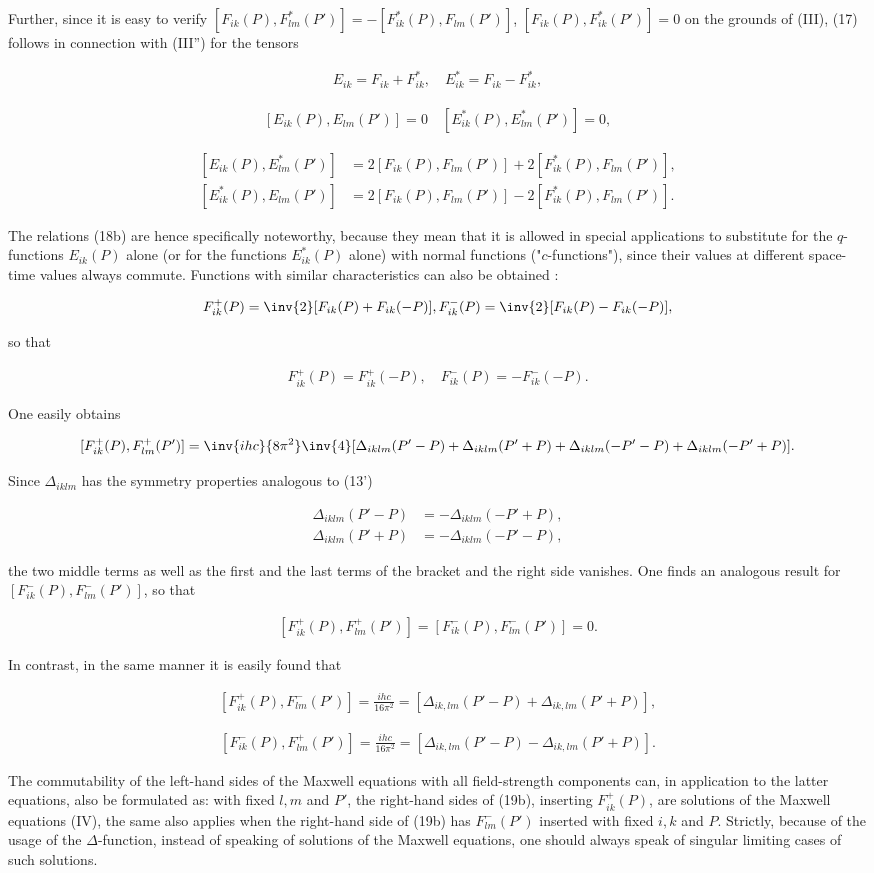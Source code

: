 \documentclass{article}
\newcommand{\nequ}[2]{
\begin{align*}
#1
\tag{#2}
\end{align*}
}
\newcommand{\uequ}[1]{
\begin{align*}
#1
\end{align*}
}
\begin{document}
Further, since it is easy to verify $[F_{ik}(P),F_{lm}^*(P')]=-[F_{ik}^*(P),F_{lm}(P')]$, $[F_{ik}(P),F_{ik}^*(P')]=0$ on the grounds of (III), (17) follows in connection with (III'') for the tensors
\nequ{
E_{ik} = F_{ik} + F^*_{ik},\quad E^*_{ik} = F_{ik} - F^*_{ik},
}{18a}
\nequ{
[E_{ik}(P),E_{lm}(P')]=0\quad [E_{ik}^*(P),E_{lm}^*(P')] = 0,
}{18b}
\uequ{
[E_{ik}(P),E_{lm}^*(P')]&=2[F_{ik}(P),F_{lm}(P')] + 2[F_{ik}^*(P),F_{lm}(P')],\\
[E_{ik}^*(P),E_{lm}(P')]&=2[F_{ik}(P),F_{lm}(P')] - 2[F_{ik}^*(P),F_{lm}(P')].
}

The relations (18b) are hence specifically noteworthy, because they mean that it is allowed in special applications to substitute for the $q$-functions $E_{ik}(P)$ alone (or for the functions $E^*_{ik}(P)$ alone) with normal functions ("$c$-functions"), since their values at different space-time values always commute. Functions with similar characteristics can also be obtained :
\uequ{
F^+_{ik}(P) = \inv{2}[F_{ik}(P) + F_{ik}(-P)], 
F_{ik}^-(P) = \inv{2}[F_{ik}(P) - F_{ik}(-P)],
}
so that
\uequ{
F_{ik}^+(P) = F_{ik}^+(-P),\quad
F_{ik}^-(P) = -F_{ik}^-(-P).
}
One easily obtains
\uequ{
[F_{ik}^+(P), F_{lm}^+(P')] = \inv{ihc}{8\pi^2}\inv{4}[
\Delta_{iklm}(P'-P) +
\Delta_{iklm}(P'+P) +
\Delta_{iklm}(-P'-P) +
\Delta_{iklm}(-P'+P)
].
}
Since $\Delta_{iklm}$ has the symmetry properties analogous to (13')
\uequ{
\Delta_{iklm}(P' - P) &= -\Delta_{iklm}(-P'+P),\\
\Delta_{iklm}(P' + P) &= -\Delta_{iklm}(-P'-P),
}
the two middle terms as well as the first and the last terms of the bracket  and the right side vanishes. One finds an analogous result for $[F^-_{ik}(P),F^-_{lm}(P')]$, so that
\nequ{
[F_{ik}^+(P), F_{lm}^+(P')] = [F_{ik}^-(P), F_{lm}^-(P')] = 0.
}{19a}
In contrast, in the same manner it is easily found that
\nequ{
[F_{ik}^+(P), F_{lm}^-(P')] = \frac{ihc}{16\pi^2} = [\Delta_{ik,lm}(P'-P) + \Delta_{ik,lm}(P'+P)],
}{19b}
\nequ{
[F_{ik}^-(P), F_{lm}^+(P')] = \frac{ihc}{16\pi^2} = [\Delta_{ik,lm}(P'-P) - \Delta_{ik,lm}(P'+P)].
}{19c}

The commutability of the left-hand sides of the Maxwell equations with all field-strength components can, in application to the latter equations, also be formulated as: with fixed $l,m$ and $P'$, the right-hand sides of (19b), inserting $F^+_{ik}(P)$, are solutions of the Maxwell equations (IV), the same also applies when the right-hand side of (19b) has $F^-_{lm}(P')$ inserted with fixed $i,k$ and $P$. Strictly, because of the usage of the $\Delta$-function, instead of speaking of solutions of the Maxwell equations, one should always speak of singular limiting cases of such solutions.
\end{document}
